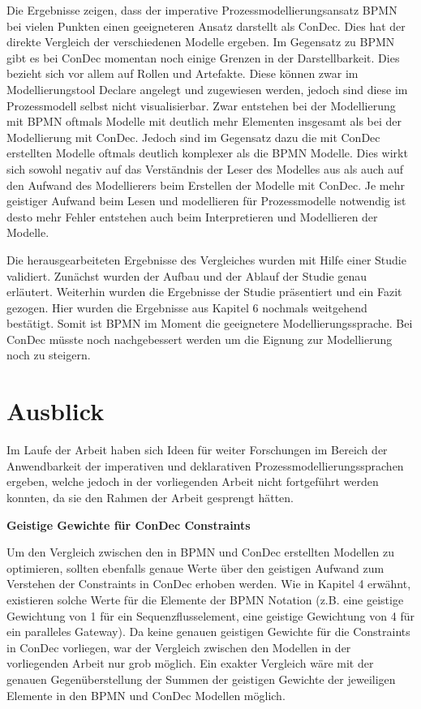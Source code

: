 Die Ergebnisse zeigen, dass der imperative Prozessmodellierungsansatz BPMN bei vielen Punkten einen geeigneteren Ansatz darstellt als ConDec. Dies hat der direkte Vergleich der verschiedenen Modelle ergeben. Im Gegensatz zu BPMN gibt es bei ConDec momentan noch einige Grenzen in der Darstellbarkeit. Dies bezieht sich vor allem auf Rollen und Artefakte. Diese können zwar im Modellierungstool Declare angelegt und zugewiesen werden, jedoch sind diese im Prozessmodell selbst nicht visualisierbar. Zwar entstehen bei der Modellierung mit BPMN oftmals Modelle mit deutlich mehr Elementen insgesamt als bei der Modellierung mit ConDec. Jedoch sind im Gegensatz dazu die mit ConDec erstellten Modelle oftmals deutlich komplexer als die BPMN Modelle. Dies wirkt sich sowohl negativ auf das Verständnis der Leser des Modelles aus als auch auf den Aufwand des Modellierers beim Erstellen der Modelle mit ConDec. Je mehr geistiger Aufwand beim Lesen und modellieren für Prozessmodelle notwendig ist desto mehr Fehler entstehen auch beim Interpretieren und Modellieren der Modelle. \newline

Die herausgearbeiteten Ergebnisse des Vergleiches wurden mit Hilfe einer Studie validiert. Zunächst wurden der Aufbau und der Ablauf der Studie genau erläutert. Weiterhin wurden die Ergebnisse der Studie präsentiert und ein Fazit gezogen. Hier wurden die Ergebnisse aus Kapitel 6 nochmals weitgehend bestätigt. Somit ist BPMN im Moment die geeignetere Modellierungssprache. Bei ConDec müsste noch nachgebessert werden um die Eignung zur Modellierung noch zu steigern.\newline


\section{Ausblick}

Im Laufe der Arbeit haben sich Ideen für weiter Forschungen im Bereich der Anwendbarkeit der imperativen und deklarativen Prozessmodellierungssprachen ergeben, welche jedoch in der vorliegenden Arbeit nicht fortgeführt werden konnten, da sie den Rahmen der Arbeit gesprengt hätten.\newline

\textbf{Geistige Gewichte für ConDec Constraints}

Um den Vergleich zwischen den in BPMN und ConDec erstellten Modellen zu optimieren, sollten ebenfalls genaue Werte über den geistigen Aufwand zum Verstehen der Constraints in ConDec erhoben werden. Wie in Kapitel 4 erwähnt, existieren solche Werte für die Elemente der BPMN Notation (z.B. eine geistige Gewichtung von 1 für ein Sequenzflusselement, eine geistige Gewichtung von 4 für ein paralleles Gateway). Da keine genauen geistigen Gewichte für die Constraints in ConDec vorliegen, war der Vergleich zwischen den Modellen in der vorliegenden Arbeit nur grob möglich. Ein exakter Vergleich wäre mit der genauen Gegenüberstellung der Summen der geistigen Gewichte der jeweiligen Elemente in den BPMN und ConDec Modellen möglich.\newline


